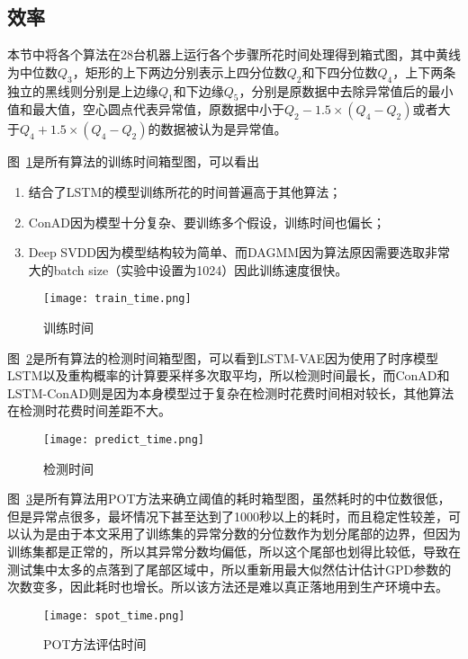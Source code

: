 \subsection{效率}
本节中将各个算法在28台机器上运行各个步骤所花时间处理得到箱式图，其中黄线为中位数$Q_3$，矩形的上下两边分别表示上四分位数$Q_2$和下四分位数$Q_4$，上下两条独立的黑线则分别是上边缘$Q_1$和下边缘$Q_5$，分别是原数据中去除异常值后的最小值和最大值，空心圆点代表异常值，原数据中小于$Q_2-1.5\times(Q_4-Q_2)$或者大于$Q_4 + 1.5\times(Q_4-Q_2)$的数据被认为是异常值。

图~\ref{fig:train:time}是所有算法的训练时间箱型图，可以看出
\begin{enumerate}
  \item 结合了LSTM的模型训练所花的时间普遍高于其他算法；
  \item ConAD因为模型十分复杂、要训练多个假设，训练时间也偏长；
  \item Deep SVDD因为模型结构较为简单、而DAGMM因为算法原因需要选取非常大的batch size（实验中设置为1024）因此训练速度很快。
\end{enumerate}

\begin{figure}[htbp]
  \centering
  \texttt{[image: train\_time.png]}
  \caption{训练时间}
  \label{fig:train:time}
\end{figure}

图~\ref{fig:test:time}是所有算法的检测时间箱型图，可以看到LSTM-VAE因为使用了时序模型LSTM以及重构概率的计算要采样多次取平均，所以检测时间最长，而ConAD和LSTM-ConAD则是因为本身模型过于复杂在检测时花费时间相对较长，其他算法在检测时花费时间差距不大。

\begin{figure}[htbp]
  \centering
  \texttt{[image: predict\_time.png]}
  \caption{检测时间}
  \label{fig:test:time}
\end{figure}

图~\ref{fig:pot:time}是所有算法用POT方法来确立阈值的耗时箱型图，虽然耗时的中位数很低，但是异常点很多，最坏情况下甚至达到了1000秒以上的耗时，而且稳定性较差，可以认为是由于本文采用了训练集的异常分数的分位数作为划分尾部的边界，但因为训练集都是正常的，所以其异常分数均偏低，所以这个尾部也划得比较低，导致在测试集中太多的点落到了尾部区域中，所以重新用最大似然估计估计GPD参数的次数变多，因此耗时也增长。所以该方法还是难以真正落地用到生产环境中去。

\begin{figure}[htbp]
  \centering
  \texttt{[image: spot\_time.png]}
  \caption{POT方法评估时间}
  \label{fig:pot:time}
\end{figure}

